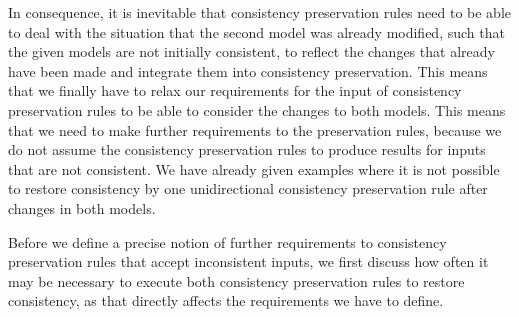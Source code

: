 In consequence, it is inevitable that consistency preservation rules need to be able to deal with the situation that the second model was already modified, such that the given models are not initially consistent, to reflect the changes that already have been made and integrate them into consistency preservation.
This means that we finally have to relax our requirements for the input of consistency preservation rules to be able to consider the changes to both models.
This means that we need to make further requirements to the preservation rules, because we do not assume the consistency preservation rules to produce results for inputs that are not consistent.
We have already given examples where it is not possible to restore consistency by one unidirectional consistency preservation rule after changes in both models.

Before we define a precise notion of further requirements to consistency preservation rules that accept inconsistent inputs, we first discuss how often it may be necessary to execute both consistency preservation rules to restore consistency, as that directly affects the requirements we have to define.



